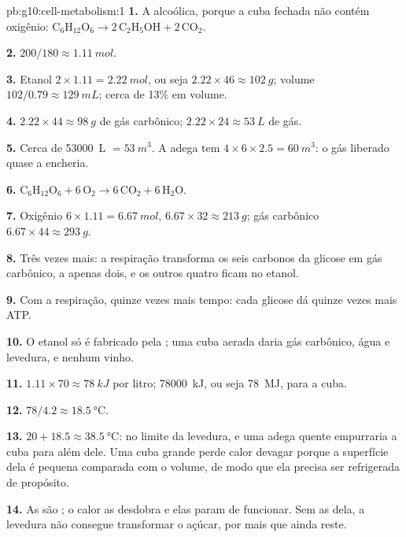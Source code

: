 \begin{solution}{pb:g10:cell-metabolism:1}
\textbf{1.} A  alcoólica, porque a cuba fechada não contém
oxigênio: $\mathrm{C_6H_{12}O_6} \to 2\,\mathrm{C_2H_5OH} +
2\,\mathrm{CO_2}$.

\textbf{2.} $200/180 \approx \qty{1.11}{mol}$.

\textbf{3.} Etanol $2 \times 1.11 = \qty{2.22}{mol}$, ou seja $2.22
\times 46 \approx \qty{102}{g}$; volume $102/0.79 \approx
\qty{129}{mL}$; cerca de 13\% em volume.

\textbf{4.} $2.22 \times 44 \approx \qty{98}{g}$ de gás carbônico;
$2.22 \times 24 \approx \qty{53}{L}$ de gás.

\textbf{5.} Cerca de \qty{53000}{L} $= \qty{53}{m^3}$. A adega tem
$4 \times 6 \times 2.5 = \qty{60}{m^3}$: o gás liberado quase a
encheria.

\textbf{6.} $\mathrm{C_6H_{12}O_6} + 6\,\mathrm{O_2} \to
6\,\mathrm{CO_2} + 6\,\mathrm{H_2O}$.

\textbf{7.} Oxigênio $6 \times 1.11 = \qty{6.67}{mol}$, $6.67 \times 32
\approx \qty{213}{g}$; gás carbônico $6.67 \times 44 \approx
\qty{293}{g}$.

\textbf{8.} Três vezes mais: a respiração transforma os seis carbonos
da glicose em gás carbônico, a  apenas dois, e os outros
quatro ficam no etanol.

\textbf{9.} Com a respiração, quinze vezes mais tempo: cada glicose dá
quinze vezes mais ATP.

\textbf{10.} O etanol só é fabricado pela ; uma cuba aerada
daria gás carbônico, água e levedura, e nenhum vinho.

\textbf{11.} $1.11 \times 70 \approx \qty{78}{kJ}$ por litro;
\qty{78000}{kJ}, ou seja \qty{78}{MJ}, para a cuba.

\textbf{12.} $78/4.2 \approx \qty{18.5}{\celsius}$.

\textbf{13.} $20 + 18.5 \approx \qty{38.5}{\celsius}$: no limite da
levedura, e uma adega quente empurraria a cuba para além dele. Uma
cuba grande perde calor devagar porque a superfície dela é pequena
comparada com o volume, de modo que ela precisa ser refrigerada de
propósito.

\textbf{14.} As  são ; o calor as desdobra e elas
param de funcionar. Sem as  dela, a levedura não consegue
transformar o açúcar, por mais que ainda reste.


\end{solution}
